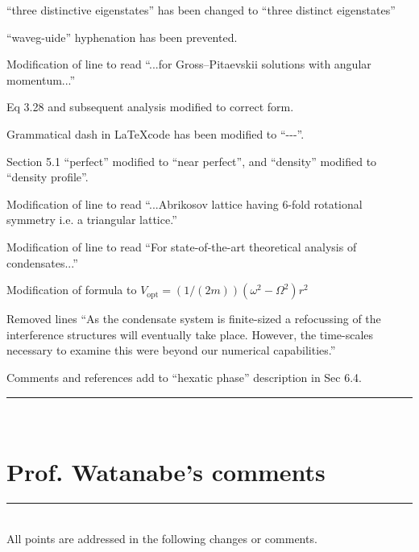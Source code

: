 \documentclass[paper=a4, fontsize=12pt]{scrartcl}
\begin{document}
\begin{description}[align=left]
    \item [P45] ``three distinctive eigenstates'' has been changed to ``three distinct eigenstates''
    \item [P49] ``waveg-uide'' hyphenation has been prevented.
    \item [P54] Modification of line to read ``...for Gross--Pitaevskii solutions with angular momentum...''
    \item [P59] Eq 3.28 and subsequent analysis modified to correct form.
    \item [P81] Grammatical dash in \LaTeX  code has been modified to ``-{}-{}-''.
    \item [P89] Section 5.1 ``perfect'' modified to ``near perfect'', and ``density'' modified to ``density profile''.
    \item [P89] Modification of line to read ``...Abrikosov lattice having 6-fold rotational symmetry i.e. a triangular lattice.''
    \item [P92] Modification of line to read ``For state-of-the-art theoretical analysis of condensates...''
    \item [P94] Modification of formula to $V_{\textrm{opt}} = (1/(2m))(\omega^2 - \Omega^2)r^2$
    \item [P101] Removed lines ``As the condensate system is finite-sized a refocussing of the interference structures will eventually take place. However, the time-scales necessary to examine this were beyond our numerical capabilities.''
    \item [P131] Comments and references add to ``hexatic phase'' description in Sec 6.4.
\end{description}
\noindent\rule{\textwidth}{1.5pt}\\[0.5cm]
\section{Prof. Watanabe's comments}
\rule{\textwidth}{1.5pt}\\[0.5cm]
All points are addressed in the following changes or comments.
\end{document}
